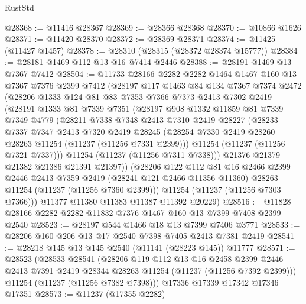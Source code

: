 \begin{lexlean}{RustStd}
\begin{coremodule}
@28368 := @11416 @28367
@28369 := @28366 @28368
@28370 := @10866 @1626
@28371 := @11420 @28370
@28372 := @28369 @28371
@28374 := @11425 (@11427 @1457)
@28378 := @28310 (@28315 (@28372 @28374 @15777))
@28384 := @28181 @1469 @112 @13 @16 @7414 @2446
@28388 := @28191 @1469 @13 @7367 @7412
@28504 := @11733
    @28166
    @2282
    @2282
    @1464
    @1467
    @160
    @13
    @7367
    @7376
    @2399
    @7412
    (@28197
      @117
      @1463
      @84
      @134
      @7367
      @7374
      @2472
      (@28206
        @1333
        @124
        @81
        @83
        @7353
        @7366
        @7373
        @2413
        @7302
        @2419
        (@28191
          @1333
          @81
          @7339
          @7351
          (@28197
            @908
            @1332
            @11859
            @81
            @7339
            @7349
            @4779
            (@28211
              @7338
              @7348
              @2413
              @7310
              @2419
              @28227
              (@28233
                @7337
                @7347
                @2413
                @7320
                @2419
                @28245
                (@28254 @7330 @2419 @28260 @28263 @11254 (@11237 (@11256 @7331 @2399)))
                @11254
                (@11237 (@11256 @7321 @7337)))
              @11254
              (@11237 (@11256 @7311 @7338)))
            @21376
            @21379
            @21382
            @21386
            @21391
            @21397))
        (@28206
          @122
          @112
          @81
          @16
          @2466
          @2399
          @2446
          @2413
          @7359
          @2419
          (@28241 @121 @2466 @11356 @11360)
          @28263
          @11254
          (@11237 (@11256 @7360 @2399)))
        @11254
        (@11237 (@11256 @7303 @7366)))
      @11377
      @11380
      @11383
      @11387
      @11392
      @20229)
@28516 := @11828 @28166 @2282 @2282 @11832 @7376 @1467 @160 @13 @7399 @7408 @2399 @2540
@28523 := @28197 @544 @1466 @18 @13 @7399 @7406 @3771
@28533 := @28206 @160 @206 @13 @17 @2540 @7398 @7405 @2413 @7381 @2419
@28541 := @28218 @145 @13 @145 @2540 (@11141 (@28223 @145)) @11777
@28571 := @28523
    (@28533
      @28541
      (@28206
        @119
        @112
        @13
        @16
        @2458
        @2399
        @2446
        @2413
        @7391
        @2419
        @28344
        @28263
        @11254
        (@11237 (@11256 @7392 @2399)))
      @11254
      (@11237 (@11256 @7382 @7398)))
    @17336
    @17339
    @17342
    @17346
    @17351
@28573 := @11237 (@17355 @2282)

\end{coremodule}
\end{lexlean}
